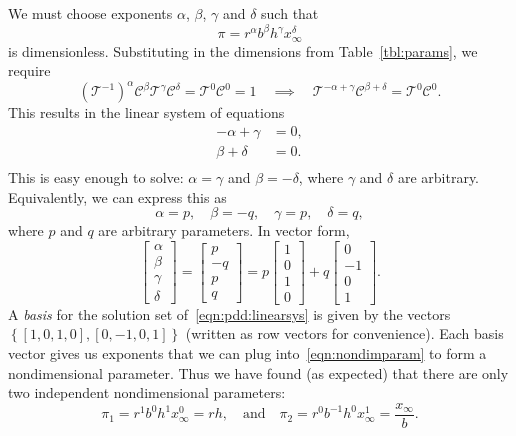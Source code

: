 We must choose exponents $\alpha$, $\beta$, $\gamma$ and $\delta$
such that
\begin{equation}
   \pi = r^{\alpha} b^{\beta} h^{\gamma} x_{\infty}^{\delta}
\label{eqn:nondimparam}
\end{equation}
is dimensionless.  Substituting in the dimensions from 
Table~\ref{tbl:params}, we require
\begin{equation}
   \left(\mathcal{T}^{-1}\right)^{\alpha} \mathcal{C}^{\beta}
       \mathcal{T}^{\gamma} \mathcal{C}^{\delta} = \mathcal{T}^0\mathcal{C}^0 = 1
       \quad\implies\quad
       \mathcal{T}^{-\alpha+\gamma}\mathcal{C}^{\beta+\delta}
        = \mathcal{T}^{0}\mathcal{C}^{0}.
\end{equation}
This results in the linear system of equations
\begin{equation}
\begin{split}
   -\alpha + \gamma & = 0, \\
    \beta + \delta & = 0. \\
\label{eqn:pdd:linearsys}
\end{split}
\end{equation}
This is easy enough to solve: $\alpha = \gamma$ and $\beta = -\delta$,
where $\gamma$ and $\delta$ are arbitrary. Equivalently, we can express
this as
\begin{equation}
  \alpha = p, \quad \beta = -q, \quad \gamma = p, \quad \delta = q,
\end{equation}
where $p$ and $q$ are arbitrary parameters.
In vector form,
\begin{equation}
\begin{bmatrix} \alpha \\ \beta \\ \gamma \\ \delta \end{bmatrix}
  =
\begin{bmatrix} p \\ -q \\ p \\ q \end{bmatrix}
  =
p\begin{bmatrix} 1 \\ 0 \\ 1 \\ 0 \end{bmatrix} +
q\begin{bmatrix} 0 \\ -1 \\ 0 \\ 1 \end{bmatrix} .
\end{equation}
A \emph{basis} for the solution set of~\eqref{eqn:pdd:linearsys}
is given by the vectors $\left\{[1,0,1,0],[0,-1,0,1]\right\}$ (written as
row vectors for convenience).
Each basis vector gives us exponents that we can plug into~\eqref{eqn:nondimparam} to form a nondimensional parameter.
Thus we have found (as expected) that there are only two
independent nondimensional parameters:
\begin{equation}
  \pi_1 = r^1 b^0 h^1 x_{\infty}^0 = rh, \quad \textrm{and}\quad
  \pi_2 = r^0 b^{-1} h^0 x_{\infty}^1 = \frac{x_{\infty}}{b}. 
\end{equation}

